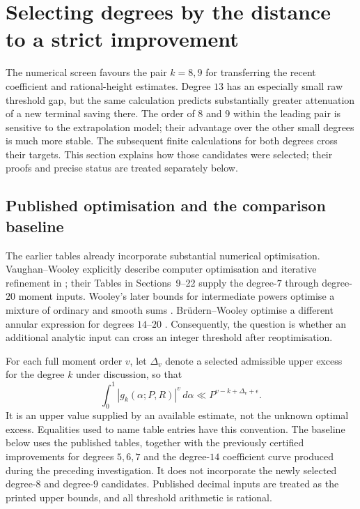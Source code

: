 \documentclass[11pt,letterpaper]{article}
\numberwithin{equation}{section}
\begin{document}
\section{Selecting degrees by the distance to a strict improvement}
\label{sec:cross-k-screen}

The numerical screen favours the pair $k=8,9$ for transferring the recent
coefficient and rational-height estimates. Degree $13$ has an especially
small raw threshold gap, but the same calculation predicts substantially
greater attenuation of a new terminal saving there. The order of $8$ and $9$
within the leading pair is sensitive to the extrapolation model; their
advantage over the other small degrees is much more stable. The subsequent
finite calculations for both degrees cross their targets. This section
explains how those candidates were selected; their proofs and precise status
are treated separately below.

\subsection{Published optimisation and the comparison baseline}

The earlier tables already incorporate substantial numerical optimisation.
Vaughan--Wooley explicitly describe computer optimisation and iterative
refinement in \cite[Section~8]{VW00}; their Tables in Sections~9--22 supply
the degree-$7$ through degree-$20$ moment inputs. Wooley's later bounds for
intermediate powers optimise a mixture of ordinary and smooth sums
\cite[Table~2 and Section~3]{W16}. Br\"udern--Wooley optimise a different
annular expression for degrees $14$--$20$ \cite[Section~8]{BW23}. Consequently,
the question is whether an additional analytic input can cross an integer
threshold after reoptimisation.

For each full moment order $v$, let $\Delta_v$ denote a selected admissible
upper excess for the degree $k$ under discussion, so that
\[
 \int_0^1|g_k(\alpha;P,R)|^v\,d\alpha
       \ll P^{v-k+\Delta_v+\epsilon}.
\]
It is an upper value supplied by an available estimate, not the unknown
optimal excess. Equalities used to name table entries have this convention.
The baseline below uses the published tables, together with the previously
certified improvements for degrees $5,6,7$ and the degree-$14$ coefficient
curve produced during the preceding investigation. It does not incorporate
the newly selected degree-$8$ and degree-$9$ candidates. Published decimal inputs are treated
as the printed upper bounds, and all threshold arithmetic is rational.
\end{document}
